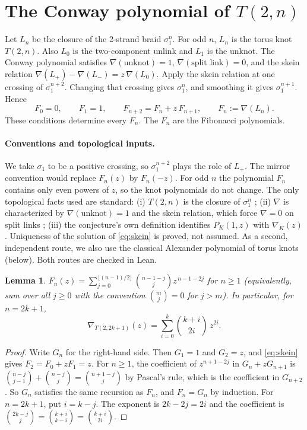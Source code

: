 \documentclass[11pt]{article}
\newtheorem{lemma}[theorem]{Lemma}
\theoremstyle{definition}
\theoremstyle{remark}
\begin{document}
\section{\texorpdfstring{The Conway polynomial of $T(2,n)$}{The Conway polynomial of T(2,n)}}

Let $L_n$ be the closure of the 2-strand braid $\sigma_1^n$. For odd $n$,
$L_n$ is the torus knot $T(2,n)$. Also $L_0$ is the two-component unlink and
$L_1$ is the unknot. The Conway polynomial satisfies
$\nabla(\text{unknot})=1$, $\nabla(\text{split link})=0$, and the skein relation
$\nabla(L_+)-\nabla(L_-)=z\,\nabla(L_0)$. Apply the skein relation at one
crossing of $\sigma_1^{n+2}$. Changing that crossing gives $\sigma_1^{n}$, and
smoothing it gives $\sigma_1^{n+1}$. Hence
\begin{equation}\label{eq:skein}
F_0=0,\qquad F_1=1,\qquad F_{n+2}=F_n+z\,F_{n+1},\qquad F_n:=\nabla(L_n).
\end{equation}
These conditions determine every $F_n$. The $F_n$ are the Fibonacci polynomials.

\paragraph{Conventions and topological inputs.} We take $\sigma_1$ to be a
positive crossing, so $\sigma_1^{n+2}$ plays the role of $L_+$. The mirror
convention would replace $F_n(z)$ by $F_n(-z)$. For odd $n$ the polynomial
$F_n$ contains only even powers of $z$, so the knot polynomials do not change.
The only topological facts used are standard:
(i) $T(2,n)$ is the closure of $\sigma_1^{n}$ \cite{rolfsen};
(ii) $\nabla$ is characterized by $\nabla(\text{unknot})=1$ and the skein
relation, which force $\nabla=0$ on split links \cite{conway,kauffman};
(iii) the conjecture's own definition identifies $P_K(1,z)$ with $\nabla_K(z)$.
Uniqueness of the solution of \eqref{eq:skein} is proved, not assumed.
As a second, independent route, we also use the classical Alexander
polynomial of torus knots (below). Both routes are checked in Lean.

\begin{lemma}\label{lem:closed}
$F_n(z)=\sum_{j=0}^{\lfloor (n-1)/2\rfloor}\binom{n-1-j}{j} z^{\,n-1-2j}$ for $n\ge1$
(equivalently, sum over all $j\ge0$ with the convention $\binom{m}{j}=0$ for $j>m$). In particular,
for $n=2k+1$,
\[
\nabla_{T(2,2k+1)}(z)=\sum_{i=0}^{k}\binom{k+i}{2i}\,z^{2i}.
\]
\end{lemma}
\begin{proof}
Write $G_n$ for the right-hand side. Then $G_1=1$ and $G_2=z$, and
\eqref{eq:skein} gives $F_2=F_0+zF_1=z$. For $n\ge1$, the coefficient of
$z^{n+1-2j}$ in $G_n+zG_{n+1}$ is
$\binom{n-j}{j-1}+\binom{n-j}{j}=\binom{n+1-j}{j}$ by Pascal's rule, which is the
coefficient in $G_{n+2}$. So $G_n$ satisfies the same recursion as $F_n$,
and $F_n=G_n$ by induction. For $n=2k+1$, put $i=k-j$. The exponent is
$2k-2j=2i$ and the coefficient is $\binom{2k-j}{j}=\binom{k+i}{k-i}=\binom{k+i}{2i}$.
\end{proof}
\end{document}
